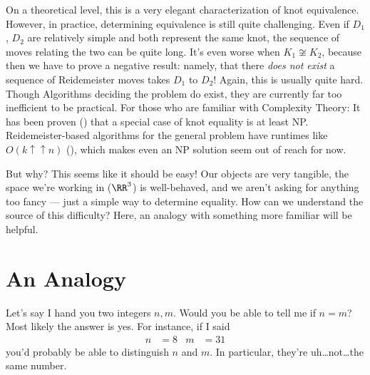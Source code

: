 On a theoretical level, this is a very elegant characterization of
knot equivalence. However, in practice, determining equivalence is
still quite challenging. Even if $D_1$, $D_2$ are relatively simple
and both represent the same knot, the sequence of moves relating the
two can be quite long. It's even worse when $K_1 \not \cong K_2$,
because then we have to prove a negative result: namely, that there
\emph{does not exist} a sequence of Reidemeister moves takes $D_1$ to
$D_2$! Again, this is usually quite hard. Though Algorithms deciding
the problem do exist, they are currently far too inefficient to be
practical. For those who are familiar with Complexity Theory: It has
been proven (\cite{Hass1998Jul}) that a special case of knot equality
is at least NP. Reidemeister-based algorithms for the general problem
have runtimes like $O(k\uparrow\uparrow n)$ (\cite{Lackenby2016Apr}),
which makes even an NP solution seem out of reach for now.




But why? This seems like it should be easy! Our objects are very
tangible, the space we're working in ($\RR^3$) is well-behaved, and we
aren't asking for anything too fancy --- just a simple way to
determine equality. How can we understand the source of this
difficulty? Here, an analogy with something more familiar will be
helpful.







\section{An Analogy}\label{sec:an-analogy}
Let's say I hand you two integers $n, m$. Would you be able to tell me
if $n = m$? Most likely the answer is yes. For instance, if I said
\begin{align*}
  n &= 8 & m &= 31
\end{align*}
you'd probably be able to distinguish $n$ and $m$. In particular,
they're uh\ldots not\ldots the same number.

